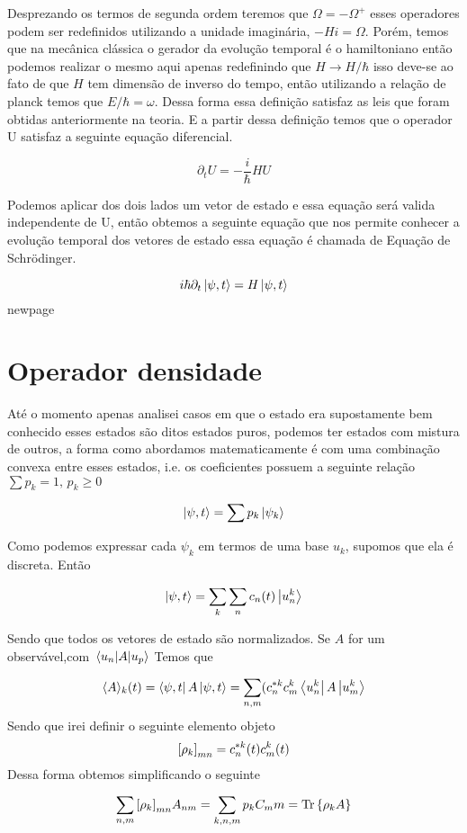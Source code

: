 \documentclass{article}
\begin{document}
	Desprezando os termos de segunda ordem teremos que \(\Omega=-\Omega^+\) esses operadores podem ser redefinidos utilizando a unidade imaginária, \(-Hi=\Omega\). Porém, temos que na mecânica clássica o gerador da evolução temporal é o hamiltoniano então podemos realizar o mesmo aqui apenas redefinindo que \(H \to H/\hbar\) isso deve-se ao fato de que $H$ tem dimensão de inverso do tempo, então utilizando a relação de planck temos que $E/\hbar=\omega$. Dessa forma essa definição satisfaz as leis que foram obtidas anteriormente na teoria. E a partir dessa definição temos que o operador U satisfaz a seguinte equação diferencial.
	
	\[\partial_t U=-\frac{i}{\hbar}HU\]
	
	Podemos aplicar dos dois lados um vetor de estado e essa equação será valida independente de U, então obtemos a seguinte equação que nos permite conhecer a evolução temporal dos vetores de estado essa equação é chamada de Equação de Schrödinger.
	
	\[i\hbar \partial_t \ket{\psi,t}=H\ket{\psi,t}\]
	newpage
	\section{Operador densidade}
	
	Até o momento apenas analisei casos em que o estado era supostamente bem conhecido esses estados são ditos estados puros, podemos ter estados com mistura de outros, a forma como abordamos matematicamente é com uma combinação convexa entre esses estados, i.e. os coeficientes possuem a seguinte relação $\sum p_k=1, \,p_k \geq0$
	
	$$\ket{\psi,t}=\sum p_k \ket{\psi_k}$$
	
	Como podemos expressar cada $\psi_k$ em termos de uma base $u_k$, supomos que ela é discreta. Então
	
	
	
	
	$$\ket{\psi,t}=\sum_{k} \sum_n c_n(t) \ket{u_n^k}$$
	
	Sendo que todos os vetores de estado são normalizados. Se $A$ for um observável,com $\mel{u_n}{A}{u_p}$ Temos que
	
	$$\langle A \rangle_k(t)=\bra{\psi,t}A\ket{\psi,t}=\sum_{n,m}( c_n^{*k}c_m^{k}\bra{u_n^k}A\ket{u_m^{k}}$$
	Sendo que irei definir o seguinte elemento objeto 
	$$\qty[\rho_k]_{mn}=c^{*k}_n(t)c_m^k(t)$$
	\newpage
	Dessa forma obtemos simplificando o seguinte
	
	
	$$\sum_{n,m} \qty[\rho_k]_{mn}A_{nm}=\sum_{k,n,m}p_k C_mm=\Tr \qty{\rho_kA}$$
	
\end{document}
